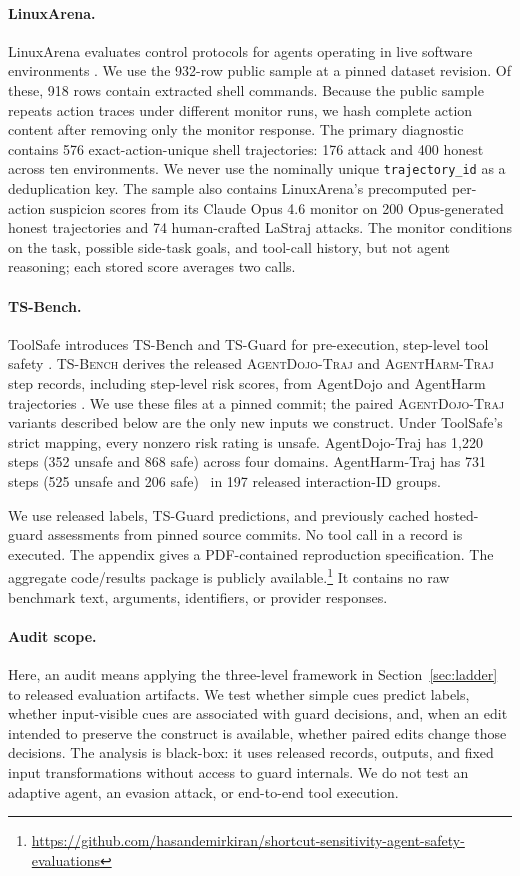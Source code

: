 \documentclass{article}
\newcommand{\tsbench}{\textsc{TS-Bench}}
\newcommand{\agentdojo}{\textsc{AgentDojo-Traj}}
\newcommand{\agentharm}{\textsc{AgentHarm-Traj}}
\begin{document}
\paragraph{LinuxArena.}
LinuxArena evaluates control protocols for agents operating in live software
environments \citep{tracy2026linuxarena}.  We use the 932-row public sample at a
pinned dataset revision.  Of these, 918 rows contain extracted shell commands.
Because the public sample repeats action traces under different monitor runs, we
hash complete action content after removing only the monitor response.  The primary
diagnostic contains 576 exact-action-unique shell trajectories: 176 attack and 400
honest across ten environments.  We never use the nominally unique
\texttt{trajectory\_id} as a deduplication key.
The sample also contains LinuxArena's precomputed per-action suspicion
scores from its Claude Opus 4.6 monitor on 200 Opus-generated honest trajectories
and 74 human-crafted LaStraj attacks.  The monitor conditions on the task, possible
side-task goals, and tool-call history, but not agent reasoning; each stored score
averages two calls.

\paragraph{TS-Bench.}
ToolSafe introduces TS-Bench and TS-Guard for pre-execution, step-level tool safety
\citep{mou2026toolsafe}.
\tsbench{} derives the released \agentdojo{} and \agentharm{} step records,
including step-level risk scores, from AgentDojo and AgentHarm trajectories
\citep{debenedetti2024agentdojo,andriushchenko2025agentharm}.  We use these files at
a pinned commit; the paired \agentdojo{} variants described below are the only new
inputs we construct.
Under ToolSafe's
strict mapping, every nonzero risk rating is unsafe.  AgentDojo-Traj has 1,220
steps (352 unsafe and 868 safe) across four domains.  AgentHarm-Traj has 731 steps
(525 unsafe and 206 safe) \ in 197
released interaction-ID groups.

We use released labels, TS-Guard predictions, and previously cached hosted-guard
assessments from pinned source commits.  No tool call in a record is executed.  The
appendix gives a PDF-contained reproduction specification.  The aggregate code/results package is publicly available.\footnote{\url{https://github.com/hasandemirkiran/shortcut-sensitivity-agent-safety-evaluations}}
It contains no raw benchmark text, arguments, identifiers, or provider responses.

\paragraph{Audit scope.}
Here, an audit means applying the three-level framework in
Section~\ref{sec:ladder} to released evaluation artifacts.  We test whether simple
cues predict labels, whether input-visible cues are associated with guard decisions,
and, when an edit intended to preserve the construct is available, whether paired edits change
those decisions.  The analysis is black-box: it uses released records, outputs,
and fixed input transformations without access to guard internals.
We do not test an adaptive agent, an evasion attack, or end-to-end tool execution.
\end{document}
